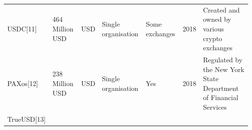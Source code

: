 \documentclass[english,]{IEEEtran}
\begin{document}
\begin{longtable}[]{@{}lllllll@{}}
\begin{minipage}[t]{0.14\columnwidth}
USDC{[}11{]}\strut
\end{minipage} & \begin{minipage}[t]{0.08\columnwidth}\raggedright\strut
464 Million USD\strut
\end{minipage} & \begin{minipage}[t]{0.08\columnwidth}\raggedright\strut
USD\strut
\end{minipage} & \begin{minipage}[t]{0.10\columnwidth}\raggedright\strut
Single organisation\strut
\end{minipage} & \begin{minipage}[t]{0.08\columnwidth}\raggedright\strut
Some exchanges\strut
\end{minipage} & \begin{minipage}[t]{0.04\columnwidth}\raggedright\strut
2018\strut
\end{minipage} & \begin{minipage}[t]{0.30\columnwidth}\raggedright\strut
Created and owned by various crypto exchanges\strut
\end{minipage}\tabularnewline
\begin{minipage}[t]{0.14\columnwidth}\raggedright\strut
PAXos{[}12{]}\strut
\end{minipage} & \begin{minipage}[t]{0.08\columnwidth}\raggedright\strut
238 Million USD\strut
\end{minipage} & \begin{minipage}[t]{0.08\columnwidth}\raggedright\strut
USD\strut
\end{minipage} & \begin{minipage}[t]{0.10\columnwidth}\raggedright\strut
Single organisation\strut
\end{minipage} & \begin{minipage}[t]{0.08\columnwidth}\raggedright\strut
Yes\strut
\end{minipage} & \begin{minipage}[t]{0.04\columnwidth}\raggedright\strut
2018\strut
\end{minipage} & \begin{minipage}[t]{0.30\columnwidth}\raggedright\strut
Regulated by the New York State Department of Financial Services\strut
\end{minipage}\tabularnewline
\begin{minipage}[t]{0.14\columnwidth}\raggedright\strut
TrueUSD{[}13{]}\strut
\end{minipage} & \begin{minipage}[t]{0.08\columnwidth}\raggedright\strut

\end{minipage}
\end{longtable}
\end{document}
